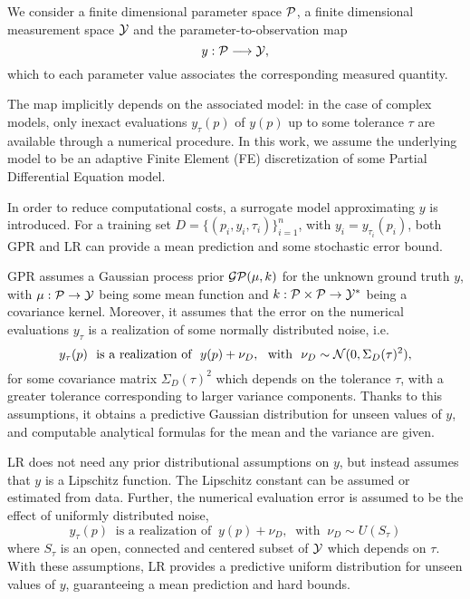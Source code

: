 We consider a finite dimensional parameter space $\mathcal P$, a finite dimensional measurement space $ \mathcal Y$ and the parameter-to-observation map 
\[
 y : \mathcal P \longrightarrow \mathcal Y, 
\]
which to each parameter value associates the corresponding measured quantity.

The map implicitly depends on the associated model: in the case of complex models, only inexact evaluations $y_\tau (p) $ of $ y(p)$ up to some tolerance $\tau$ are available through a numerical procedure. 
In this work, we assume the underlying model to be an adaptive Finite Element (FE) discretization of some Partial Differential Equation model. 

In order to reduce computational costs, a surrogate model approximating $y$ is introduced.
For a training set $D = \{(p_i,y_i,\tau_i)\}_{i=1}^n$, with $y_i = y_{\tau_i}(p_i)$, both GPR and LR can provide a mean prediction and some stochastic error bound. 

GPR assumes a Gaussian process prior $\mathcal G \mathcal P (\mu, k)$ for the unknown ground truth $y$, with $\mu : \mathcal P \rightarrow \mathcal Y$ being some mean function and $k: \mathcal P \times \mathcal P \rightarrow \mathcal Y^* $ being a covariance kernel.
Moreover, it assumes that the error on the numerical evaluations $y_\tau$ is a realization of some normally distributed noise, i.e. 
\begin{equation}\label{eq:GPR-noise}
    y_\tau(p) \ \text{ is a realization of } \ y(p) + \nu_D,  \ \text{ with } \ \nu_D \sim \mathcal N (0, \Sigma_D(\tau)^2),    
\end{equation}
for some covariance matrix $\Sigma_D(\tau)^2$ which depends on the tolerance $\tau$, with a greater tolerance corresponding to larger variance components.
Thanks to this assumptions, it obtains a predictive Gaussian distribution for unseen values of $y$, and computable analytical formulas for the mean and the variance are given.

LR does not need any prior distributional assumptions on $y$, but instead assumes that $y$ is a Lipschitz function.
The Lipschitz constant can be assumed or estimated from data.
Further, the numerical evaluation error is assumed to be the effect of uniformly distributed noise,  
\begin{equation}\label{eq:LR-noise}
    y_\tau(p) \ \text{ is a realization of } \ y(p) + \nu_D,  \ \text{ with } \ \nu_D \sim U(S_\tau )    
\end{equation}
where $S_\tau$ is an open, connected and centered subset of $\mathcal Y$ which depends on $\tau$.
With these assumptions, LR provides a predictive uniform distribution for unseen values of $y$, guaranteeing a mean prediction and hard bounds.


